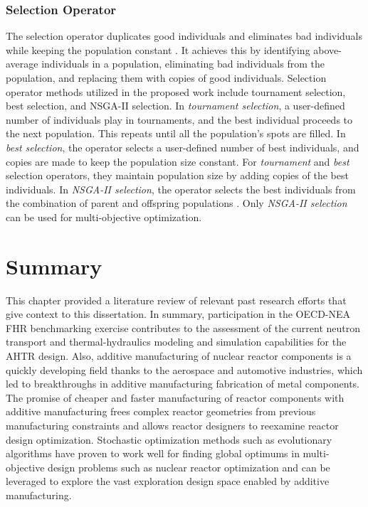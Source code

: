 \subsubsection{Selection Operator}
The selection operator duplicates good individuals and eliminates bad individuals 
while keeping the population constant \cite{deb_multi-objective_2001}. 
It achieves this by identifying above-average individuals in a population, 
eliminating bad individuals from the population, and replacing them with 
copies of good individuals.
Selection operator methods utilized in the proposed work include tournament 
selection, best selection, and \gls{NSGA-II} selection. 
In \textit{tournament selection}, a user-defined number of individuals play in 
tournaments, and the best individual proceeds to the next population.
This repeats until all the population's spots are filled. 
In \textit{best selection}, the operator selects a user-defined number of best 
individuals, and copies are made to keep the population size constant. 
For \textit{tournament} and \textit{best} selection operators, they maintain 
population size by adding copies of the best individuals. 
In \textit{NSGA-II selection}, the operator selects the best individuals 
from the combination of parent and offspring populations \cite{deb_fast_2002}.
Only \textit{NSGA-II selection} can be used for multi-objective optimization. 

\section{Summary}
This chapter provided a literature review of relevant past research 
efforts that give context to this dissertation. 
In summary, participation in the OECD-NEA FHR benchmarking exercise contributes 
to the assessment of the current neutron transport and thermal-hydraulics 
modeling and simulation capabilities for the \gls{AHTR} design.
Also, additive manufacturing of nuclear reactor components is a quickly 
developing field thanks to the aerospace and automotive industries, which led to 
breakthroughs in additive manufacturing fabrication of metal components. 
The promise of cheaper and faster manufacturing of reactor components with 
additive manufacturing frees complex reactor geometries from previous 
manufacturing constraints and allows reactor designers to reexamine reactor 
design optimization.  
Stochastic optimization methods such as evolutionary algorithms have proven to 
work well for finding global optimums in multi-objective design problems such as 
nuclear reactor optimization and can be leveraged to explore the vast exploration 
design space enabled by additive manufacturing.
